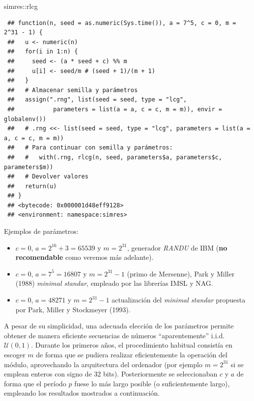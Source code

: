 \documentclass[
]{book}
\newenvironment{Shaded}{\begin{snugshade}}{\end{snugshade}}
\newcommand{\NormalTok}[1]{#1}
\newcommand{\SpecialCharTok}[1]{\textcolor[rgb]{0.00,0.00,0.00}{#1}}
\theoremstyle{break}
\theoremstyle{nonumberplain}
\begin{document}
\begin{Shaded}
\begin{Highlighting}[]
\NormalTok{simres}\SpecialCharTok{::}\NormalTok{rlcg}
\end{Highlighting}
\end{Shaded}

\begin{verbatim}
 ## function(n, seed = as.numeric(Sys.time()), a = 7^5, c = 0, m = 2^31 - 1) {
 ##   u <- numeric(n)
 ##   for(i in 1:n) {
 ##     seed <- (a * seed + c) %% m
 ##     u[i] <- seed/m # (seed + 1)/(m + 1)
 ##   }
 ##   # Almacenar semilla y parámetros
 ##   assign(".rng", list(seed = seed, type = "lcg",
 ##           parameters = list(a = a, c = c, m = m)), envir = globalenv())
 ##   # .rng <<- list(seed = seed, type = "lcg", parameters = list(a = a, c = c, m = m))
 ##   # Para continuar con semilla y parámetros:
 ##   #   with(.rng, rlcg(n, seed, parameters$a, parameters$c, parameters$m))
 ##   # Devolver valores
 ##   return(u)
 ## }
 ## <bytecode: 0x000001d48eff9128>
 ## <environment: namespace:simres>
\end{verbatim}

Ejemplos de parámetros:

\begin{itemize}
\item
  \(c=0\), \(a=2^{16}+3=65539\) y \(m=2^{31}\), generador \emph{RANDU} de IBM
  (\textbf{no recomendable} como veremos más adelante).
\item
  \(c=0\), \(a=7^{5}=16807\) y \(m=2^{31}-1\) (primo de Mersenne), Park y Miller (1988)
  \emph{minimal standar}, empleado por las librerías IMSL y NAG.
\item
  \(c=0\), \(a=48271\) y \(m=2^{31}-1\) actualización del \emph{minimal standar}
  propuesta por Park, Miller y Stockmeyer (1993).
\end{itemize}

A pesar de su simplicidad, una adecuada elección de los parámetros permite obtener de manera eficiente secuencias de números ``aparentemente'' i.i.d. \(\mathcal{U}(0,1)\).
Durante los primeros años, el procedimiento habitual consistía en escoger \(m\) de forma que se pudiera realizar eficientemente la operación del módulo, aprovechando la arquitectura del ordenador (por ejemplo \(m = 2^{31}\) si se emplean enteros con signo de 32 bits).
Posteriormente se seleccionaban \(c\) y \(a\) de forma que el período \(p\) fuese lo más largo posible (o suficientemente largo), empleando los resultados mostrados a continuación.
\end{document}
